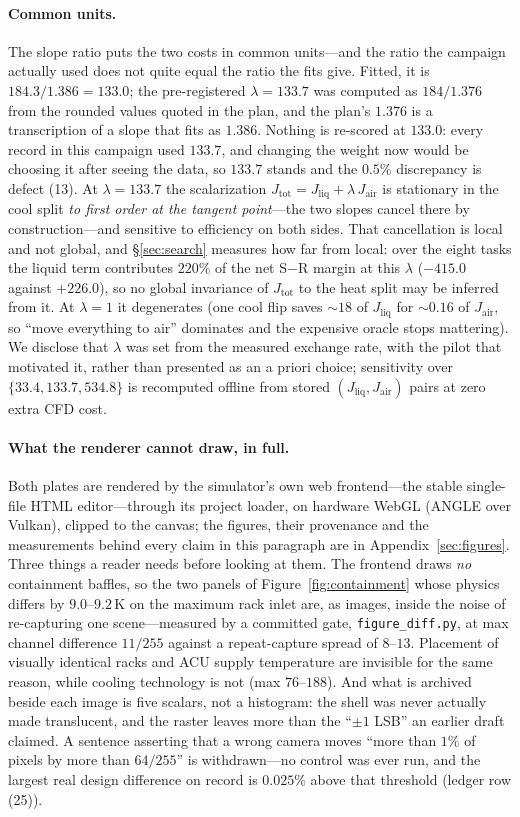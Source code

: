 \documentclass{article}
\newcommand{\Jliq}{J_{\mathrm{liq}}}
\newcommand{\Jair}{J_{\mathrm{air}}}
\newcommand{\Jtot}{J_{\mathrm{tot}}}
\begin{document}
\paragraph{Common units.}
The slope ratio puts the two costs in common units---and the ratio the campaign
actually used does not quite equal the ratio the fits give.  Fitted, it is
$184.3/1.386 = 133.0$; the pre-registered $\lambda = 133.7$ was computed as
$184/1.376$ from the rounded values quoted in the plan, and the plan's $1.376$ is a
transcription of a slope that fits as $1.386$.  Nothing is re-scored at $133.0$:
every record in this campaign used $133.7$, and changing the weight now would be
choosing it after seeing the data, so $133.7$ stands and the $0.5\%$ discrepancy is
defect (13).  At $\lambda = 133.7$ the scalarization
$\Jtot = \Jliq + \lambda\,\Jair$ is stationary in the cool split \emph{to first
order at the tangent point}---the two slopes cancel there by construction---and
sensitive to efficiency on both sides.  That cancellation is local and not global,
and \S\ref{sec:search} measures how far from local: over the eight tasks the
liquid term contributes $220\%$ of the net S$-$R margin at this $\lambda$
($-415.0$ against $+226.0$), so no global invariance of $\Jtot$ to the heat split
may be inferred from it.  At $\lambda = 1$ it degenerates (one
cool flip saves $\sim18$ of $\Jliq$ for $\sim0.16$ of $\Jair$, so ``move
everything to air'' dominates and the expensive oracle stops mattering).  We
disclose that $\lambda$ was set from the measured exchange rate, with the pilot
that motivated it, rather than presented as an a priori choice; sensitivity over
$\{33.4,\allowbreak 133.7,\allowbreak 534.8\}$ is recomputed offline from stored $(\Jliq, \Jair)$
pairs at zero extra CFD cost.

\paragraph{What the renderer cannot draw, in full.}
Both plates are rendered by the simulator's own web frontend---the stable single-file
HTML editor---through its project loader, on hardware WebGL (ANGLE over Vulkan), clipped
to the canvas; the figures, their provenance and the measurements behind every claim in
this paragraph are in Appendix~\ref{sec:figures}.  Three things a reader needs before
looking at them.  The frontend draws \emph{no} containment baffles, so the two panels of
Figure~\ref{fig:containment} whose physics differs by $9.0$--$9.2$\,K on the maximum rack
inlet are, as images, inside the noise of re-capturing one scene---measured by a
committed gate, \texttt{figure\_diff.py}, at max channel difference $11/255$ against a
repeat-capture spread of $8$--$13$.  Placement of visually identical racks and ACU
supply temperature are invisible for the same reason, while cooling technology is not
(max $76$--$188$).  And what is archived beside each image is five scalars, not a
histogram: the shell was never actually made translucent, and the raster leaves more
than the ``$\pm1$ LSB'' an earlier draft claimed.  A sentence asserting that a wrong
camera moves ``more than $1\%$ of pixels by more than $64/255$'' is withdrawn---no
control was ever run, and the largest real design difference on record is $0.025\%$
above that threshold (ledger row (25)).
\end{document}

